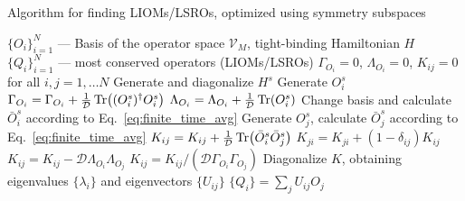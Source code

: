 \begin{algorithm}[h]
  \algrenewcommand{}
  \algrenewcommand{}
  \caption{Algorithm for finding LIOMs/LSROs, optimized using symmetry subspaces}
  \label{alg:liom_alg}
  \begin{algorithmic}[1]
    \Require  \(\{O_i\}_{i=1}^N\) --- Basis of the operator space \(\mathcal{V}_M\), tight-binding Hamiltonian \(H\)
    \Ensure \(\{Q_i\}_{i=1}^N\) --- most conserved operators (LIOMs/LSROs)
    \State \(\Gamma_{O_i} = 0\), \(\Lambda_{O_i} = 0\), \(K_{ij} = 0\) for all \(i,j = 1,\ldots N\)
    \State Generate and diagonalize \(H^s\)
    \State Generate \(O_i^s\)
    \State \(\Gamma_{O_i} = \Gamma_{O_i} + \frac{1}{\mathcal{D}}\Tr((O_i^s)^{\dag}O_i^s)\)
    \State \(\Lambda_{O_i} = \Lambda_{O_i} + \frac{1}{\mathcal{D}}\Tr(O_i^s)\)
    \State Change basis and calculate \(\bar{O}_i^s\) according to Eq.~\eqref{eq:finite_time_avg}
    \State Generate \(O_j^s\), calculate \(\bar{O}_j^s\) according to Eq.~\eqref{eq:finite_time_avg}
    \State \(K_{ij} = K_{ij} + \frac{1}{\mathcal{D}}\Tr(\bar{O}_i^s \bar{O}_j^s)\)
    \State \(K_{ji} = K_{ji} + (1 - \delta_{ij}) K_{ij}\)
    \EndFor
    \EndFor
    \EndFor
    \State \(K_{ij} = K_{ij} - \mathcal{D} \Lambda_{O_i} \Lambda_{O_j}\)
    \State \(K_{ij} = K_{ij}/(\mathcal{D} \Gamma_{O_i} \Gamma_{O_j})\)
    \EndFor
    \State Diagonalize \(K\), obtaining eigenvalues \(\{\lambda_i\}\) and eigenvectors \(\{U_{ij}\}\)
    \State \(\{Q_i\} = \sum_j U_{ij} O_j\)
  \end{algorithmic}
\end{algorithm}

